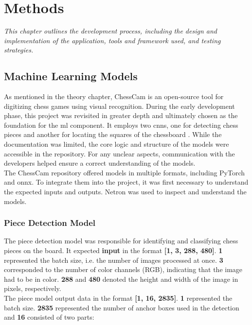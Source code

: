 \chapter{Methods}
\label{chp:methods}

\begin{center}
    \textit{This chapter outlines the development process, including the design and implementation of the application, tools and framework used, and testing strategies.}
\end{center}


\section{Machine Learning Models}
\label{sec:ml-models}

As mentioned in the theory chapter, ChessCam is an open-source tool for digitizing chess games using visual recognition. During the early development phase, this project was revisited in greater depth and ultimately chosen as the foundation for the \gls{ml} component. It employs two \glspl{cnn}, one for detecting chess pieces and another for locating the squares of the chessboard \cite{github:chesscam}. While the documentation was limited, the core logic and structure of the models were accessible in the repository. For any unclear aspects, communication with the developers helped ensure a correct understanding of the models. \\

The ChessCam repository offered models in multiple formats, including PyTorch and \gls{onnx}. To integrate them into the project, it was first necessary to understand the expected inputs and outputs. Netron was used to inspect and understand the models.


\subsection{Piece Detection Model}
The piece detection model was responsible for identifying and classifying chess pieces on the board. It expected \textbf{input} in the format \textbf{[1, 3, 288, 480]}. \textbf{1} represented the batch size, i.e. the number of images processed at once. \textbf{3} corresponded to the number of color channels (RGB), indicating that the image had to be in color. \textbf{288} and \textbf{480} denoted the height and width of the image in pixels, respectively. \\

The piece model output data in the format \textbf{[1, 16, 2835]}. \textbf{1} represented the batch size. \textbf{2835} represented the number of anchor boxes used in the detection and \textbf{16} consisted of two parts: \\

